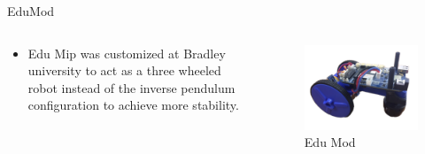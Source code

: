 \documentclass{beamer}
\begin{document}
\begin{frame}{EduMod}
\begin{columns}
\begin{column}{0.5\textwidth}
\begin{block}{}
\begin{itemize}
\item Edu Mip was customized at Bradley university to act as a three wheeled robot instead of the inverse pendulum configuration to achieve more stability.
\end{itemize}
\end{block}
\end{column}
\begin{column}{0.5\textwidth}
\begin{center}
\begin{figure}
\includegraphics[scale=0.25]{figs/img/eduMod.png}
\caption{Edu Mod}
\end{figure}
\end{center}
\end{column}
\end{columns}
\end{frame}
\end{document}
